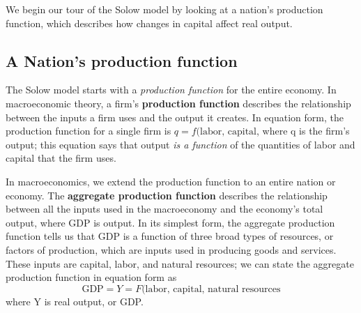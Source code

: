 \documentclass[11pt]{article} %
\begin{document}
We begin our tour of the Solow model by looking at a nation's production function, which describes how changes in capital affect real output.
\subsection*{A Nation's production function}
The Solow model starts with a \textit{production function} for the entire economy. In macroeconomic theory, a firm's \textbf{production function} describes the relationship between the inputs a firm uses and the output it creates. In equation form, the production function for a single firm is \(q=f(\text{labor, capital}\), where q is the firm's output; this equation says that output \textit{is a function} of the quantities of labor and capital that the firm uses.

In macroeconomics, we extend the production function to an entire nation or economy. The \textbf{aggregate production function} describes the relationship between all the inputs used in the macroeconomy and the economy's total output, where GDP is output. In its simplest form, the aggregate production function tells us that GDP is a function of three broad types of resources, or factors of production, which are inputs used in producing goods and services. These inputs are capital, labor, and natural resources; we can state the aggregate production function in equation form as
\begin{equation}
\text{GDP}= Y = F(\text{labor, capital, natural resources}
\end{equation}
where Y is real output, or GDP.
\end{document}
